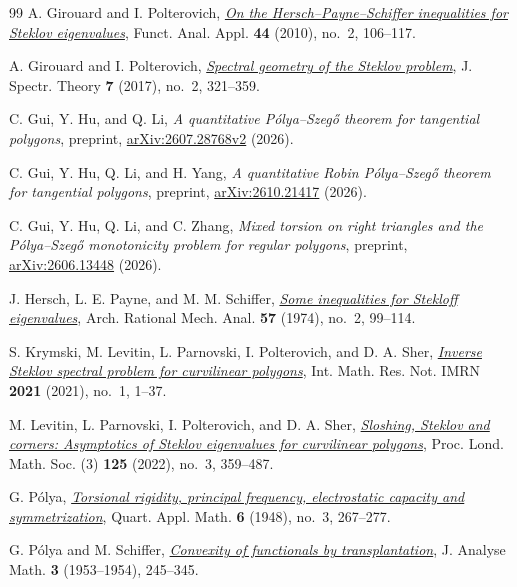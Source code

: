 \documentclass[11pt]{amsart}
\theoremstyle{remark}\newtheorem{remark}[theorem]{Remark}
\numberwithin{equation}{section}
\begin{document}
\begin{thebibliography}{99}
A. Girouard and I. Polterovich,
\href{https://doi.org/10.1007/s10688-010-0014-1}{\emph{On the Hersch--Payne--Schiffer inequalities for Steklov eigenvalues}},
Funct. Anal. Appl. \textbf{44} (2010), no.~2, 106--117.

A. Girouard and I. Polterovich,
\href{https://doi.org/10.4171/JST/164}{\emph{Spectral geometry of the Steklov problem}},
J. Spectr. Theory \textbf{7} (2017), no.~2, 321--359.

C. Gui, Y. Hu, and Q. Li,
\emph{A quantitative P\'olya--Szeg\H{o} theorem for tangential polygons}, preprint,
\href{https://arxiv.org/abs/2607.28768v2}{arXiv:2607.28768v2} (2026).

C. Gui, Y. Hu, Q. Li, and H. Yang,
\emph{A quantitative Robin P\'olya--Szeg\H{o} theorem for tangential polygons}, preprint,
\href{https://arxiv.org/abs/2610.21417}{arXiv:2610.21417} (2026).

C. Gui, Y. Hu, Q. Li, and C. Zhang,
\emph{Mixed torsion on right triangles and the P\'olya--Szeg\H{o} monotonicity problem for regular polygons}, preprint,
\href{https://arxiv.org/abs/2606.13448}{arXiv:2606.13448} (2026).

J. Hersch, L. E. Payne, and M. M. Schiffer,
\href{https://doi.org/10.1007/BF00248412}{\emph{Some inequalities for Stekloff eigenvalues}},
Arch. Rational Mech. Anal. \textbf{57} (1974), no.~2, 99--114.

S. Krymski, M. Levitin, L. Parnovski, I. Polterovich, and D. A. Sher,
\href{https://doi.org/10.1093/imrn/rnaa200}{\emph{Inverse Steklov spectral problem for curvilinear polygons}},
Int. Math. Res. Not. IMRN \textbf{2021} (2021), no.~1, 1--37.

M. Levitin, L. Parnovski, I. Polterovich, and D. A. Sher,
\href{https://doi.org/10.1112/plms.12461}{\emph{Sloshing, Steklov and corners: Asymptotics of Steklov eigenvalues for curvilinear polygons}},
Proc. Lond. Math. Soc. (3) \textbf{125} (2022), no.~3, 359--487.

G. P\'olya,
\href{https://doi.org/10.1090/qam/26817}{\emph{Torsional rigidity, principal frequency, electrostatic capacity and symmetrization}},
Quart. Appl. Math. \textbf{6} (1948), no.~3, 267--277.

G. P\'olya and M. Schiffer,
\href{https://doi.org/10.1007/BF02803593}{\emph{Convexity of functionals by transplantation}},
J. Analyse Math. \textbf{3} (1953--1954), 245--345.


\end{thebibliography}
\end{document}
